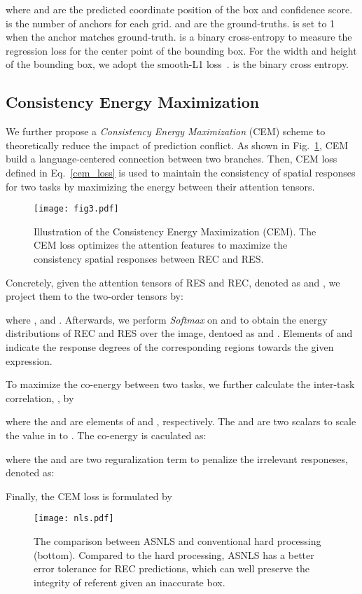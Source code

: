 \documentclass[10pt,twocolumn,letterpaper]{article}
\begin{document}
where  and   are the predicted  coordinate position of the  box and confidence score.  is the number of anchors for each grid.   and  are the ground-truths.    is set to 1 when the anchor  matches  ground-truth.   is a  binary cross-entropy to measure the regression loss for the center point of the bounding box. For the width and height of the bounding box, we adopt the smooth-L1 loss~\cite{ren2017faster}.   is the binary cross entropy.

\subsection{Consistency Energy Maximization}
We further propose a \emph{Consistency Energy Maximization} (CEM) scheme  to theoretically reduce the impact of prediction conflict.
As shown in Fig.~\ref{cem},  CEM build  a language-centered connection between two branches. Then, CEM loss defined in Eq.~\ref{cem_loss} is used to maintain the consistency of  spatial responses  for two tasks by maximizing the energy between their  attention tensors. 

\begin{figure}[t]
	\centering
	\texttt{[image: fig3.pdf]}
\caption{Illustration of the Consistency Energy Maximization (CEM). The CEM loss optimizes the attention features to maximize the consistency spatial responses between REC and RES. }
	\label{cem} 
	\vspace{-0.6em}
\end{figure}
Concretely, given the attention tensors of RES and REC, denoted as  and , 
we project them to the two-order tensors by: 

where ,  and .  
Afterwards, we perform \emph{Softmax} on  and  to obtain the energy distributions of REC and RES over the  image, dentoed as  and .
Elements of  and   indicate the response degrees of the corresponding regions  towards the given expression.  

To maximize the co-energy between two tasks, we further calculate the inter-task correlation, , by 

where the  and  are elements of   and , respectively. The  and  are two scalars to scale the value in  to .
The  co-energy   is caculated as: 

where the  and  are two reguralization term to penalize  the irrelevant responeses, denoted as:

Finally, the CEM loss is formulated by 

\begin{figure}[t]
	\centering
	\texttt{[image: nls.pdf]}
\caption{The comparison between ASNLS and conventional hard processing (bottom).  Compared to the hard processing,  ASNLS has a better error tolerance for REC predictions, which can well  preserve the integrity of  referent given an inaccurate box.}
	\label{fig3} 
	\vspace{-2em}
\end{figure}
\end{document}
